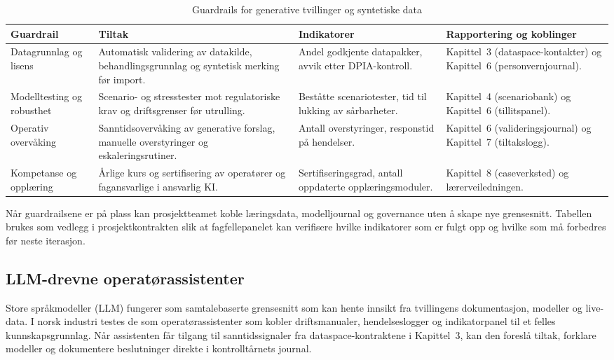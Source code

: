 \begin{table}[htbp]
    \centering
    \caption{Guardrails for generative tvillinger og syntetiske data}
    \label{tab:guardrails-generativ}
    \begin{tabular}{p{3.6cm}p{4.0cm}p{3.8cm}p{3.6cm}}
        \toprule
        \textbf{Guardrail} & \textbf{Tiltak} & \textbf{Indikatorer} & \textbf{Rapportering og koblinger} \\
        \midrule
        Datagrunnlag og lisens & Automatisk validering av datakilde, behandlingsgrunnlag og syntetisk merking før import. & Andel godkjente datapakker, avvik etter DPIA-kontroll. & Kapittel~3 (dataspace-kontakter) og Kapittel~6 (personvernjournal). \\
        \addlinespace
        Modelltesting og robusthet & Scenario- og stresstester mot regulatoriske krav og driftsgrenser før utrulling. & Beståtte scenariotester, tid til lukking av sårbarheter. & Kapittel~4 (scenariobank) og Kapittel~6 (tillitspanel). \\
        \addlinespace
        Operativ overvåking & Sanntidsovervåking av generative forslag, manuelle overstyringer og eskaleringsrutiner. & Antall overstyringer, responstid på hendelser. & Kapittel~6 (valideringsjournal) og Kapittel~7 (tiltakslogg). \\
        \addlinespace
        Kompetanse og opplæring & Årlige kurs og sertifisering av operatører og fagansvarlige i ansvarlig KI. & Sertifiseringsgrad, antall oppdaterte opplæringsmoduler. & Kapittel~8 (caseverksted) og lærerveiledningen. \\
        \bottomrule
    \end{tabular}
\end{table}

Når guardrailsene er på plass kan prosjektteamet koble læringsdata, modelljournal og governance uten å skape nye grensesnitt. Tabellen brukes som vedlegg i prosjektkontrakten slik at fagfellepanelet kan verifisere hvilke indikatorer som er fulgt opp og hvilke som må forbedres før neste iterasjon.

\subsection{LLM-drevne operatørassistenter}
Store språkmodeller (LLM) fungerer som samtalebaserte grensesnitt som kan hente innsikt fra tvillingens dokumentasjon, modeller og live-data.\citep{openai2024gpt4o} I norsk industri testes de som operatørassistenter som kobler driftsmanualer, hendelseslogger og indikatorpanel til et felles kunnskapsgrunnlag. Når assistenten får tilgang til sanntidssignaler fra dataspace-kontraktene i Kapittel~3, kan den foreslå tiltak, forklare modeller og dokumentere beslutninger direkte i kontrolltårnets journal.

